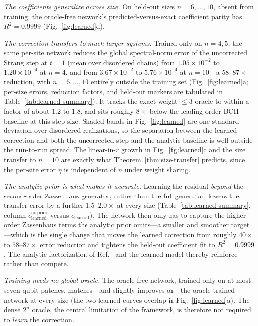 \documentclass[aps,prxquantum,reprint,superscriptaddress,nofootinbib,amsmath,amssymb]{revtex4-2}
\begin{document}
\emph{The coefficients generalize across size.} On held-out sizes $n=6,\dots,10$, absent from training, the oracle-free network's predicted-versus-exact coefficient parity has $R^2=0.9999$ (Fig.~\ref{fig:learned}d).

\emph{The correction transfers to much larger systems.} Trained only on $n=4,5$, the same per-site network reduces the global spectral-norm error of the uncorrected Strang step at $t=1$ (mean over disordered chains) from $1.05\times10^{-2}$ to $1.20\times10^{-4}$ at $n=4$, and from $3.67\times10^{-2}$ to $5.76\times10^{-4}$ at $n=10$---a $58$--$87\times$ reduction, with $n=6,\dots,10$ entirely outside the training set (Fig.~\ref{fig:learned}a; per-size errors, reduction factors, and held-out markers are tabulated in Table~\ref{tab:learned-summary}). It tracks the exact weight-$\leq3$ oracle to within a factor of about $1.2$ to $1.8$, and sits roughly $8\times$ below the leading-order BCH baseline at this step size. Shaded bands in Fig.~\ref{fig:learned} are one standard deviation over disordered realizations, so the separation between the learned correction and both the uncorrected step and the analytic baseline is well outside the run-to-run spread. The linear-in-$r$ growth in Fig.~\ref{fig:learned}c and the size transfer to $n=10$ are exactly what Theorem~\ref{thm:size-transfer} predicts, since the per-site error $\eta$ is independent of $n$ under weight sharing.

\emph{The analytic prior is what makes it accurate.} Learning the residual \emph{beyond} the second-order Zassenhaus generator, rather than the full generator, lowers the transfer error by a further $1.5$--$2.0\times$ at every size (Table~\ref{tab:learned-summary}, column $\epsilon^{\mathrm{no\,prior}}_{\mathrm{learned}}$ versus $\epsilon_{\mathrm{learned}}$). The network then only has to capture the higher-order Zassenhaus terms the analytic prior omits---a smaller and smoother target---which is the single change that moves the learned correction from roughly $40\times$ to $58$--$87\times$ error reduction and tightens the held-out coefficient fit to $R^2=0.9999$. The analytic factorization of Ref.~\cite{nguyen2025zassenhaus} and the learned model thereby reinforce rather than compete.

\emph{Training needs no global oracle.} The oracle-free network, trained only on at-most-seven-qubit patches, matches---and slightly improves on---the oracle-trained network at every size (the two learned curves overlap in Fig.~\ref{fig:learned}a). The dense $2^n$ oracle, the central limitation of the framework, is therefore not required to \emph{learn} the correction.
\end{document}
